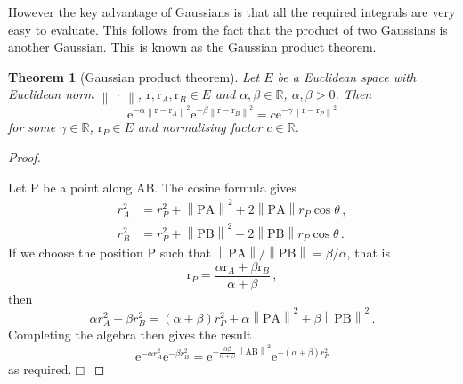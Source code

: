 \documentclass{article}
\theoremstyle{plain}\theoremheaderfont{\normalfont\itshape}\theorembodyfont{\rmfamily}\theoremseparator{.}\newtheorem*{rem}{Remark}\newtheorem*{ex}{Example}\newtheorem*{proof}{Proof}\newtheorem*{altp}{Alternative proof}
\theoremstyle{plain}\theoremheaderfont{\normalfont\bfseries}\theorembodyfont{\rmfamily}\theoremseparator{.}\newtheorem{thm}{Theorem}[section]\newtheorem{lem}[thm]{Lemma}\newtheorem{prop}[thm]{Proposition}\newtheorem*{cor}{Corollary}\newtheorem{defn}[thm]{Definition}\newtheorem{clm}[thm]{Claim}\newtheorem{clminproof}{Claim}
\theoremstyle{break}\theoremheaderfont{\normalfont\itshape}\theorembodyfont{\rmfamily}\theoremseparator{.\medskip}\newtheorem*{proofskip}{Proof}\newtheorem*{exs}{Examples}\newtheorem*{rems}{Remarks}
\theoremstyle{break}\theoremheaderfont{\normalfont\bfseries}\theorembodyfont{\rmfamily}\theoremseparator{.\medskip}\newtheorem{lemskip}[thm]{Lemma}\newtheorem{defnskip}[thm]{Definition}\newtheorem{propskip}[thm]{Proposition}\newtheorem{thmskip}[thm]{Theorem}
\numberwithin{equation}{section}
\newcommand{\qed}{\hfill\ensuremath{\Box}}
\newcommand{\e}{\mathrm{e}}
\newcommand{\vb}[1]{\bm{\mathrm{#1}}}
\newcommand{\norm}[1]{\left\| #1 \right\|}
\begin{document}
    However the key advantage of Gaussians is that all the required integrals are very easy to evaluate. This follows from the fact that the product of two Gaussians is another Gaussian. This is known as the Gaussian product theorem.
    \begin{thm}[Gaussian product theorem]
        Let \(E\) be a Euclidean space with Euclidean norm \(\norm{\ \cdot \ }\), \(\vb{r},\vb{r}_A,\vb{r}_B\in E\) and \(\alpha,\beta\in\mathbb{R}\), \(\alpha,\beta>0\). Then 
        \begin{equation}
            \e^{-\alpha\norm{\vb{r}-\vb{r}_A}^2}\e^{-\beta\norm{\vb{r}-\vb{r}_B}^2}=c\e^{-\gamma\norm{\vb{r}-\vb{r}_P}^2}
        \end{equation}
        for some \(\gamma\in\mathbb{R}\), \(\vb{r}_P\in E\) and normalising factor \(c\in\mathbb{R}\).
    \end{thm}
    \begin{proof}
        \begin{figure}[ht!]
            \centering
        \end{figure}
        Let \(\vb{P}\) be a point along \(\vb{AB}\). The cosine formula gives
        \begin{align}
            r_A^2 &= r_P^2+\norm{\vb{PA}}^2+2\norm{\vb{PA}}r_P\cos\theta\,,\\
            r_B^2 &= r_P^2+\norm{\vb{PB}}^2-2\norm{\vb{PB}}r_P\cos\theta\,.
        \end{align}
        If we choose the position \(\vb{P}\) such that \(\norm{\vb{PA}}/\norm{\vb{PB}}=\beta/\alpha\), that is
        \begin{equation}
            \vb{r}_P=\frac{\alpha\vb{r}_A+\beta\vb{r}_B}{\alpha+\beta}\,,
        \end{equation}
        then
        \begin{equation}
            \alpha r_A^2+\beta r_B^2=(\alpha+\beta)r_P^2+\alpha\norm{\vb{PA}}^2+\beta\norm{\vb{PB}}^2\,.
        \end{equation}
        Completing the algebra then gives the result
        \begin{equation}
            \e^{-\alpha r_A^2}\e^{-\beta r_B^2}=\e^{-\frac{\alpha\beta}{\alpha+\beta}\norm{\vb{AB}}^2}\e^{-(\alpha+\beta)r_P^2}
        \end{equation}
        as required.\qed
    \end{proof}
\end{document}
